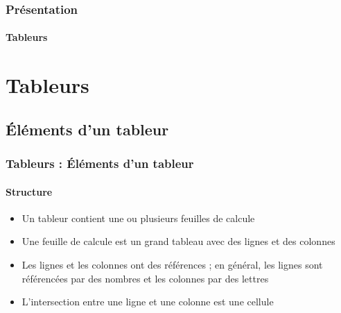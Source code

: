 \documentclass[xcolor=table, usenames,dvipsnames]{beamer}
\begin{document}
\begin{frame}
\frametitle{Présentation}
\framesubtitle{Tableurs}

\begin{multicols}{2}
	\tableofcontents
\end{multicols}
\end{frame}

\section{Tableurs}

\subsection{Éléments d'un tableur}

\begin{frame}
\frametitle{Tableurs : Éléments d'un tableur}
\framesubtitle{Structure}

\begin{minipage}{0.49\textwidth}
	\begin{itemize}
		\item Un tableur contient une ou plusieurs feuilles de calcule 
		\item Une feuille de calcule est un grand tableau avec des lignes et des colonnes 
		\item Les lignes et les colonnes ont des références ; en général, les lignes sont référencées par des nombres et les colonnes par des lettres
		\item L'intersection entre une ligne et une colonne est une cellule
	\end{itemize}
\end{minipage}
%
\begin{minipage}{0.5\textwidth} 
\end{minipage}

\end{frame}
\end{document}
